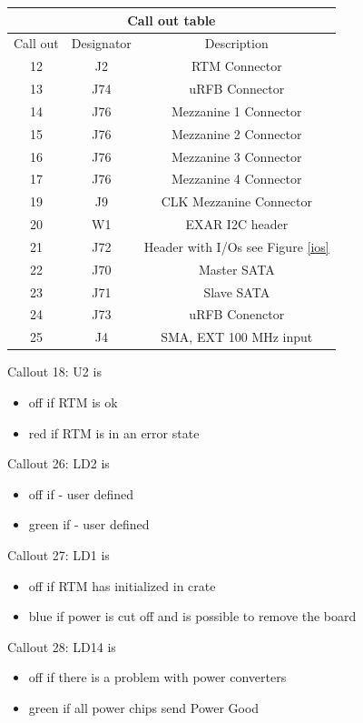 \begin{longtable}{|c|c|c|} \hline
	\multicolumn{3}{|c|}{Call out table } \\ \hline	
	Call out & Designator & Description \\ \hline
	12 & J2 & RTM Connector \\ \hline
	13 & J74 & uRFB Connector \\ \hline
	14 & J76 & Mezzanine 1 Connector \\ \hline
	15 & J76 & Mezzanine 2 Connector \\ \hline
	16 & J76 & Mezzanine 3 Connector \\ \hline
	17 & J76 & Mezzanine 4 Connector \\ \hline	
	19 & J9 & CLK Mezzanine Connector\\ \hline
	20 & W1 & EXAR I2C header \\ \hline
	21 & J72 & Header with I/Os see Figure \ref{ios} \\ \hline
	22 & J70 & Master SATA  \\ \hline
	23 & J71 & Slave SATA \\ \hline
	24 & J73 & uRFB Conenctor \\ \hline
	25 & J4 & SMA, EXT 100 MHz input \\ \hline


\end{longtable}


Callout 18: U2 is
\begin{itemize}
	\item off if RTM is ok 
	\item red if RTM is in an error state
\end{itemize}

Callout 26: LD2 is
\begin{itemize}
	\item off if - user defined
	\item green if - user defined
\end{itemize}

Callout 27: LD1 is
\begin{itemize}
	\item off if RTM has initialized in crate
	\item blue if  power is cut off and is possible to remove the board
\end{itemize}

Callout 28: LD14 is
\begin{itemize}
	\item off if there is a problem with power converters
	\item green if all power chips send Power Good
\end{itemize}

